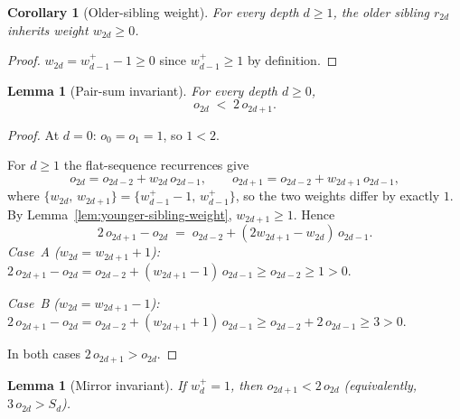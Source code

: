 \documentclass[12pt]{article}
\newtheorem{lemma}[theorem]{Lemma}
\newtheorem{corollary}[theorem]{Corollary}
\theoremstyle{definition}
\theoremstyle{remark}
\theoremstyle{plain}
\begin{document}
\begin{corollary}[Older-sibling weight]
\label{cor:older-sibling-weight}
For every depth $d \geq 1$, the older sibling $r_{2d}$ inherits weight $w_{2d} \geq 0$.
\end{corollary}

\begin{proof}
$w_{2d} = w^+_{d-1} - 1 \geq 0$ since $w^+_{d-1} \geq 1$ by definition.
\end{proof}

\begin{lemma}[Pair-sum invariant]
\label{lem:pair-sum-invariant}
For every depth $d \geq 0$,
\[
  o_{2d} \;<\; 2\,o_{2d+1}.
\]
\end{lemma}

\begin{proof}
At $d = 0$: $o_0 = o_1 = 1$, so $1 < 2$.

For $d \geq 1$ the flat-sequence recurrences give
\[
  o_{2d} = o_{2d-2} + w_{2d}\,o_{2d-1}, \qquad
  o_{2d+1} = o_{2d-2} + w_{2d+1}\,o_{2d-1},
\]
where $\{w_{2d},\, w_{2d+1}\} = \{w^+_{d-1}-1,\, w^+_{d-1}\}$, so the two
weights differ by exactly $1$.
By Lemma~\ref{lem:younger-sibling-weight}, $w_{2d+1} \geq 1$.  Hence
\[
  2\,o_{2d+1} - o_{2d}
  \;=\; o_{2d-2} + (2w_{2d+1} - w_{2d})\,o_{2d-1}.
\]
\textit{Case~A ($w_{2d} = w_{2d+1} + 1$):}
$2\,o_{2d+1} - o_{2d} = o_{2d-2} + (w_{2d+1}-1)\,o_{2d-1} \geq o_{2d-2} \geq 1 > 0$.

\textit{Case~B ($w_{2d} = w_{2d+1} - 1$):}
$2\,o_{2d+1} - o_{2d} = o_{2d-2} + (w_{2d+1}+1)\,o_{2d-1} \geq o_{2d-2} + 2\,o_{2d-1} \geq 3 > 0$.

In both cases $2\,o_{2d+1} > o_{2d}$.
\end{proof}

\begin{lemma}[Mirror invariant]
\label{lem:mirror-invariant}
If $w^+_d = 1$, then $o_{2d+1} < 2\,o_{2d}$ (equivalently, $3\,o_{2d} > S_d$).
\end{lemma}
\end{document}
